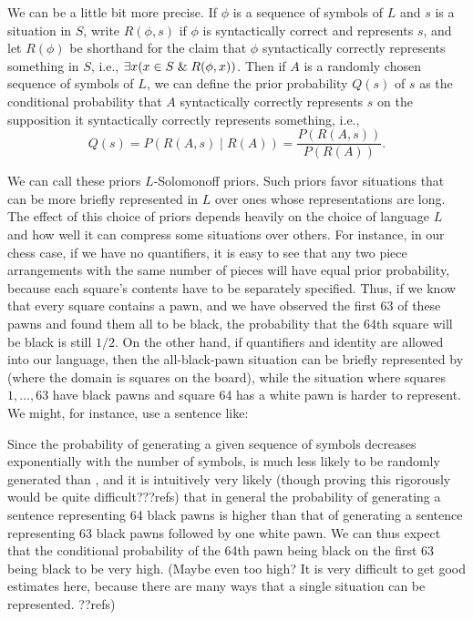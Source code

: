 We can be a little bit more precise. If $\phi$ is a sequence of symbols of $L$ and $s$ is a situation in $S$, write
$R(\phi,s)$ if $\phi$ is syntactically correct and represents $s$, and let $R(\phi)$ be shorthand for the claim that $\phi$ syntactically
correctly represents something in $S$, i.e., $\exists x(x\in S\mathrel{\&} R(\phi,x))$. Then if $A$ is a randomly chosen sequence of symbols of $L$,
we can define the prior probability $Q(s)$ of $s$ as the conditional probability that $A$ syntactically correctly represents $s$ on the supposition
it syntactically correctly represents something, i.e.,
$$
    Q(s) = P(R(A,s)\mid R(A)) = \frac{P(R(A,s))}{P(R(A))}.
$$    

We can call these priors $L$-Solomonoff priors.
Such priors favor situations that can be more briefly represented in $L$ over ones whose representations are long.
The effect of this choice of priors depends heavily on the choice of language $L$ and how well it can compress some situations over
others. For instance, in our chess case, if we have no quantifiers, it is easy to see that any two piece arrangements with 
the same number of pieces will have equal prior probability, because each square's contents have to be separately specified. 
Thus, if we know that every square contains a pawn, and we have observed the first 63 of these pawns and found them all to be black, the 
probability that the 64th square will be black is still $1/2$. On the other hand, if quantifiers and identity are allowed into our
language, then the all-black-pawn situation can be briefly represented by
(where the domain is
squares on the board), while the situation where squares $1,...,63$ have black pawns and square 64 has a white pawn is harder
to represent. We might, for instance, use a sentence like:

Since the probability of generating a given sequence of symbols decreases exponentially with the number of symbols, 
is much less likely to be randomly generated than , and it is intuitively very likely (though proving this rigorously would
be quite difficult???refs) that in general the probability of generating a sentence representing 64 black pawns is higher than that of 
generating a sentence representing 63 black pawns followed by one white pawn. We can thus expect that the conditional probability of
the 64th pawn being black on the first 63 being black to be very high. (Maybe even too high? It is very difficult to get good
estimates here, because there are many ways that a single situation can be represented. ??refs)

